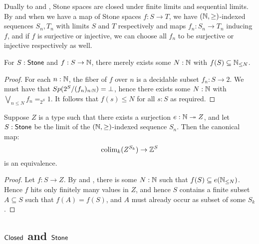 \begin{remark}\label{StoneClosedUnderPullback}\label{ProFiniteMapsFactorization}
  Dually to  and , 
  Stone spaces are closed under finite limits and sequential limits.
  By  and 
   when we have a map of Stone spaces $f:S\to T$, 
  we have $(\mathbb{N},\geq)$-indexed sequences $S_n,T_n$ with limits $S$ and $T$ respectively
  and maps $f_n:S_n\to T_n$ inducing $f$, and if $f$ is surjective or injective, we 
  can choose all $f_n$ to be surjective or injective respectively as well. 
\end{remark}
\begin{lemma}\label{MapsStoneToNareBounded}
  For $S:\mathsf{Stone}$ and $f:S \to \mathbb{N}$, there merely exists some $N:\mathbb{N}$ with $f(S)\subseteq \mathbb{N}_{\leq N}$. 
\end{lemma}
\begin{proof}
  For each $n:\mathbb{N}$, the fiber of $f$ over $n$ is a decidable subset $f_n:S \to 2$. 
  We must have that $Sp(2^S/(f_n)_{n:\mathbb{N}}) = \bot$, hence there exists some $N:\mathbb{N}$ with 
  $\bigvee_{n\leq N} f_n =_{2^S} 1 $. 
  It follows that $f(s)\leq N$ for all $s:S$ as required. 
\end{proof}
%
\begin{lemma}\label{scott-continuity}
  Suppose $Z$ is a type such that there exists a surjection $e:\mathbb{N} \twoheadrightarrow Z$, 
  and let $S:\mathsf{Stone}$ be the limit of the $(\mathbb{N},\geq)$-indexed sequence $S_n$. 
  Then the canonical map:
  \[\mathrm{colim}_k(Z^{S_k}) \to \mathbb{Z}^S\] 
  is an equivalence.
\end{lemma}
\begin{proof}
  Let $f:S \to Z$.
  By  and , there is some $N:\mathbb{N}$ such that 
  $f(S)\subseteq e(\mathbb{N}_{\leq N})$. 
  Hence $f$ hits only finitely many values in $Z$, and hence $S$ contains a finite subset 
  $A\subseteq S$ such that $f(A) = f(S)$, and $A$ must already occur as subset of some $S_k$. 
\end{proof} 

\subsection{$\mathsf{Closed}$ and $\mathsf{Stone}$}

